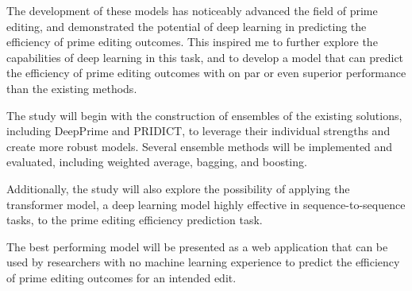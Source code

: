 The development of these models has noticeably advanced the field of prime editing, and demonstrated the potential of deep learning in predicting the efficiency of prime editing outcomes. This inspired me to further explore the capabilities of deep learning in this task, and to develop a model that can predict the efficiency of prime editing outcomes with on par or even superior performance than the existing methods.


The study will begin with the construction of ensembles of the existing solutions, including DeepPrime and PRIDICT, to leverage their individual strengths and create more robust models. Several ensemble methods will be implemented and evaluated, including weighted average, bagging, and boosting.

Additionally, the study will also explore the possibility of applying the transformer model, a deep learning model highly effective in sequence-to-sequence tasks, to the prime editing efficiency prediction task. 

The best performing model will be presented as a web application that can be used by researchers with no machine learning experience to predict the efficiency of prime editing outcomes for an intended edit.